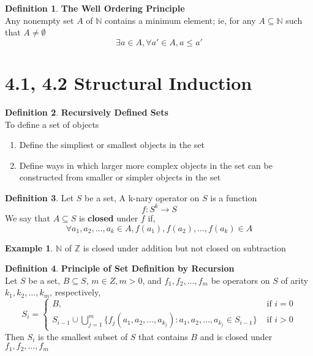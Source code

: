 \documentclass[11pt]{article}
\theoremstyle{plain}%
\theoremstyle{definition}
\newtheorem{defn}{Definition}
\newtheorem{exmp}{Example}[defn]
\theoremstyle{remark}
\newcommand{\N}{\mathbb{N}}
\begin{document}
\begin{defn}
  \label{Principle of Well Ordering}
  \textbf{The Well Ordering Principle}\\ Any nonempty set $A$ of $\N$ contains a minimum element; ie, for any $A\subseteq \N$ such that $A\neq \emptyset$
  \[
    \exists a\in A, \forall a'\in A, a\leq a'
  \]
\end{defn}


\section*{4.1, 4.2 Structural Induction}

\begin{defn}
  \label{recursively defined sets}
  \textbf{Recursively Defined Sets}\\
  To define a set of objects
  \begin{enumerate}
    \item Define the simpliest or smallest objects in the set
    \item Define ways in which larger more complex objects in the set can be constructed from smaller or simpler objects in the set
  \end{enumerate}
\end{defn}



\begin{defn}
  \label{function closure}
  Let $S$ be a set, A k-nary operator on $S$ is a function
  \[
    f: S^k \to S \tag{ $S^k$ is the k-fold Cartesian product of S}
  \]
  We say that $A\subseteq S$ is \textbf{closed} under $f$ if,
  \[
    \forall a_1, a_2, \dots, a_k\in A, f(a_1), f(a_2), \dots, f(a_k)
\in A  \]
  \begin{exmp}
    $\N$ of $\mathbb{Z}$ is closed under addition but not closed on subtraction
  \end{exmp}
\end{defn}


\begin{defn}
  \label{Principle of Set Definition by Recursion}
  \textbf{Principle of Set Definition by Recursion}\\
  Let $S$ be a set, $B\subseteq S$, $m\in Z, m>0$, and $f_1, f_2, \dots, f_m$ be operators on $S$ of arity $k_1, k_2, \dots, k_m$, respectively,
  \[
    S_i =
    \begin{cases}
      B, & \text{ if } i=0\\
      S_{i-1} \cup \bigcup_{j=1}^{m}\{ f_j(a_1, a_2, \dots, a_{k_j}): a_1, a_2, \dots, a_{k_j}\in S_{i-1}\} & \text{ if } i>0
    \end{cases}
  \]
  Then $S_i$ is the smallest subset of $S$ that contains $B$ and is closed under $f_1, f_2, \dots, f_m$
\end{defn}
\end{document}
